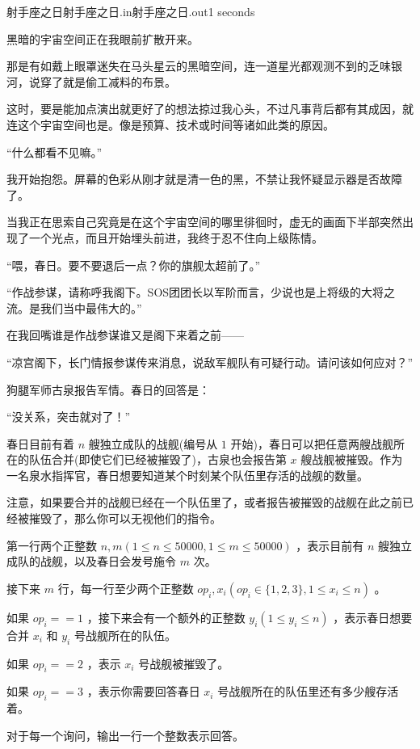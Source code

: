 \begin{problem}{射手座之日}{射手座之日.in}{射手座之日.out}{1 seconds}


黑暗的宇宙空间正在我眼前扩散开来。

那是有如戴上眼罩迷失在马头星云的黑暗空间，连一道星光都观测不到的乏味银河，说穿了就是偷工减料的布景。

这时，要是能加点演出就更好了的想法掠过我心头，不过凡事背后都有其成因，就连这个宇宙空间也是。像是预算、技术或时间等诸如此类的原因。

“什么都看不见嘛。”

我开始抱怨。屏幕的色彩从刚才就是清一色的黑，不禁让我怀疑显示器是否故障了。

当我正在思索自己究竟是在这个宇宙空间的哪里徘徊时，虚无的画面下半部突然出现了一个光点，而且开始埋头前进，我终于忍不住向上级陈情。

“喂，春日。要不要退后一点？你的旗舰太超前了。”

“作战参谋，请称呼我阁下。SOS团团长以军阶而言，少说也是上将级的大将之流。是我们当中最伟大的。”

在我回嘴谁是作战参谋谁又是阁下来着之前——

“凉宫阁下，长门情报参谋传来消息，说敌军舰队有可疑行动。请问该如何应对？”

狗腿军师古泉报告军情。春日的回答是：

“没关系，突击就对了！”

春日目前有着 $n$ 艘独立成队的战舰(编号从 $1$ 开始)，春日可以把任意两艘战舰所在的队伍合并(即使它们已经被摧毁了)，古泉也会报告第 $x$ 艘战舰被摧毁。作为一名泉水指挥官，春日想要知道某个时刻某个队伍里存活的战舰的数量。

注意，如果要合并的战舰已经在一个队伍里了，或者报告被摧毁的战舰在此之前已经被摧毁了，那么你可以无视他们的指令。

\InputFile

第一行两个正整数 $n,m (1 \leq n \leq 50000 , 1 \leq m \leq 50000)$ ，表示目前有 $n$ 艘独立成队的战舰，以及春日会发号施令 $m$ 次。

接下来 $m$ 行，每一行至少两个正整数 $op_i,x_i (op_i \in \{ 1,2,3 \} , 1 \leq x_i \leq n)$ 。

如果 $op_i==1$ ，接下来会有一个额外的正整数 $y_i (1 \leq y_i \leq n )$ ，表示春日想要合并 $x_i$ 和 $y_i$ 号战舰所在的队伍。

如果 $op_i==2$ ，表示 $x_i$ 号战舰被摧毁了。

如果 $op_i==3$ ，表示你需要回答春日 $x_i$ 号战舰所在的队伍里还有多少艘存活着。

\OutputFile

对于每一个询问，输出一行一个整数表示回答。

\Examples

\begin{example}
%
\end{example}
\end{problem}
